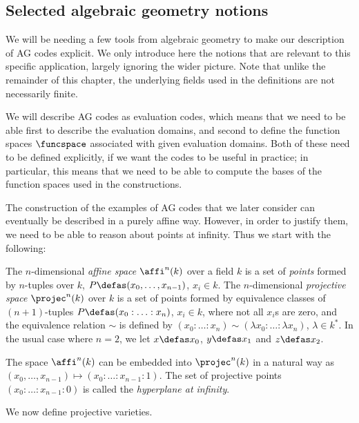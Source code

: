 \subsection{Selected algebraic geometry notions}

We will be needing a few tools from algebraic geometry to make our description of AG codes explicit. We only introduce
here the notions that are relevant to this specific application,
largely ignoring the wider picture. Note that unlike the remainder of this chapter, the underlying fields used in the definitions
are not necessarily finite.

We will describe AG codes as evaluation codes, which means that we need to be able first to describe the evaluation domains,
and second to
define the function spaces $\funcspace$ associated with given evaluation domains. Both of these need to be defined explicitly,
if we want the codes to be useful in practice; in particular, this means that we need to be able
to compute the bases of the function spaces used in the constructions.

\medskip

The construction of the examples of AG codes that we later consider can eventually be described in a purely affine way. However, in order to
justify them, we need to be able to reason about points at infinity. Thus we start with the following:

\begin{defi}
\label{def:affiprojec}
The $n$-dimensional \emph{affine space} $\affi^n(k)$ over a field $k$ is a set of \emph{points} formed by $n$-tuples over $k$,
$P \defas (x_0, \ldots, x_{n-1})$, $x_i \in k$.
The $n$-dimensional \emph{projective space} $\projec^n(k)$ over $k$ is a set of points formed by equivalence classes of $(n+1)$-tuples
$P \defas (x_0 : \ldots : x_n)$, $x_i \in k$, where not all $x_i$s are zero, and the equivalence relation $\sim$ is
defined by $(x_0 : \ldots : x_n) \sim (\lambda x_0 : \ldots : \lambda x_n)$, $\lambda \in k^*$. In the usual case where $n = 2$, we let
$x \defas x_0$, $y \defas x_1$ and $z \defas x_2$.

\noindent
The space $\affi^n(k)$ can be embedded into $\projec^n(k)$ in a natural way as $(x_0, \ldots, x_{n-1}) \mapsto (x_0 : \ldots : x_{n-1} : 1)$.
The set of projective points $(x_0 : \ldots : x_{n-1} : 0)$ is called the \emph{hyperplane at infinity}.
\end{defi}

We now define projective varieties.

